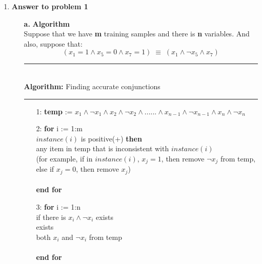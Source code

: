 

\usepackage{graphicx,amssymb,amsmath, listings}
\lstset{language = Matlab}
\lstset{breaklines}
\lstset{extendedchars=false}

\oddsidemargin 0in
\evensidemargin 0in
\textwidth 6.5in
\topmargin -0.5in
\textheight 9.0in




\pagestyle{myheadings}  %

\begin{enumerate}
\item {\bf Answer to problem 1}

\begin{enumerate}
\item[{\bf a.}] {\bf Algorithm}\\

Suppose that we have {\bf m} training samples and there is {\bf n} variables.
And also, suppose that:
\begin{displaymath}
(x_1 = 1 \wedge x_5 = 0 \wedge x_7 = 1) \; \equiv \; (x_1 \wedge \neg x_5 \wedge x_7)
\end{displaymath}
\rule{400pt}{2pt}\\
{\bf Algorithm:} Finding accurate conjunctions\\
\rule{400pt}{1pt}
\begin{enumerate}

\item[1:] {\bf temp} := $x_1 \wedge \neg x_1 \wedge x_2 \wedge \neg x_2 \wedge......\wedge x_{n-1} \wedge \neg x_{n-1} \wedge x_n \wedge \neg x_n$

\item[2:] {\bf for} i := 1:m\\
\indent {} $instance(i)$ is positive(+) {\bf then}\\
\indent \qquad {} any item in temp that is inconsistent with $instance(i)$\\
\indent \qquad \qquad (for example, if in $instance(i)$, $x_j = 1$, then remove $\neg x_j$ from temp,\\
\indent \qquad \qquad else if $x_j = 0$, then remove $x_j$)\\
\indent {}\\
{\bf end for}

\item[3:] {\bf for} i := 1:n\\
\indent {} if there is $x_i \wedge \neg x_i$ exists\\
\indent {} exists\\
\indent \qquad {} both $x_i$ and $\neg x_i$ from temp\\
\indent {}\\
{\bf end for}


\end{enumerate}
\end{enumerate}
\end{enumerate}
